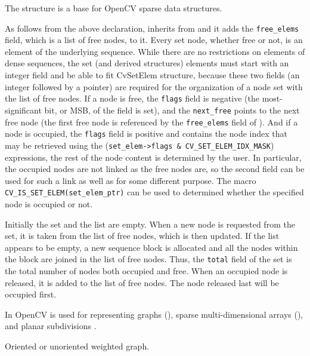 The structure  is a base for OpenCV sparse data structures.

As follows from the above declaration,  inherits from
 and it adds the \texttt{free\_elems} field, which
is a list of free nodes, to it. Every set node, whether free or not, is an
element of the underlying sequence. While there are no restrictions on
elements of dense sequences, the set (and derived structures) elements
must start with an integer field and be able to fit CvSetElem structure,
because these two fields (an integer followed by a pointer) are required
for the organization of a node set with the list of free nodes. If a node is
free, the \texttt{flags} field is negative (the most-significant bit, or
MSB, of the field is set), and the \texttt{next\_free} points to the next
free node (the first free node is referenced by the \texttt{free\_elems}
field of ). And if a node is occupied, the \texttt{flags} field
is positive and contains the node index that may be retrieved using the
(\texttt{set\_elem->flags \& CV\_SET\_ELEM\_IDX\_MASK}) expressions, the rest of
the node content is determined by the user. In particular, the occupied
nodes are not linked as the free nodes are, so the second field can be
used for such a link as well as for some different purpose. The macro
\texttt{CV\_IS\_SET\_ELEM(set\_elem\_ptr)} can be used to determined whether
the specified node is occupied or not.

Initially the set and the list are empty. When a new node is requested
from the set, it is taken from the list of free nodes, which is then updated. If the list appears to be empty, a new sequence block is allocated
and all the nodes within the block are joined in the list of free
nodes. Thus, the \texttt{total} field of the set is the total number of nodes
both occupied and free. When an occupied node is released, it is added
to the list of free nodes. The node released last will be occupied first.

In OpenCV  is used for representing graphs (),
sparse multi-dimensional arrays (), and planar subdivisions
.


\label{CvGraph}
Oriented or unoriented weighted graph.


